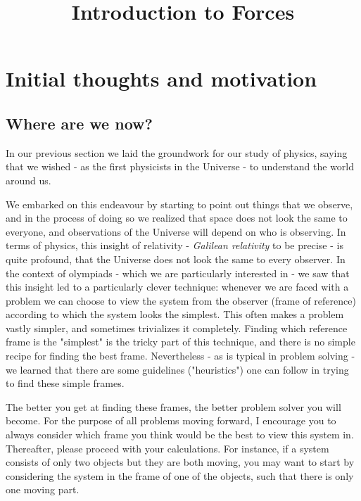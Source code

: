 \documentclass{article}
\title{Introduction to Forces}
\date{}
\begin{document}
\maketitle

\section{Initial thoughts and motivation}
\subsection{Where are we now?}
In our previous section we laid the groundwork for our study of physics, saying that we wished - as the first physicists in the Universe - to understand the world around us. 

We embarked on this endeavour by starting to point out things that we observe, and in the process of doing so we realized that space does not look the same to everyone, and observations of the Universe will depend on who is observing. In terms of physics, this insight of relativity - \textit{Galilean relativity} to be precise - is quite profound, that the Universe does not look the same to every observer. In the context of olympiads - which we are particularly interested in - we saw that this insight led to a particularly clever technique: whenever we are faced with a problem we can choose to view the system from the observer (frame of reference) according to which the system looks the simplest. This often makes a problem vastly simpler, and sometimes trivializes it completely. Finding which reference frame is the "simplest" is the tricky part of this technique, and there is no simple recipe for finding the best frame. Nevertheless - as is typical in problem solving - we learned that there are some guidelines ("heuristics") one can follow in trying to find these simple frames. 
   
The better you get at finding these frames, the better problem solver you will become. For the purpose of all problems moving forward, I encourage you to always consider which frame you think would be the best to view this system in. Thereafter, please proceed with your calculations. For instance, if a system consists of only two objects but they are both moving, you may want to start by considering the system in the frame of one of the objects, such that there is only one moving part.

\end{document}
